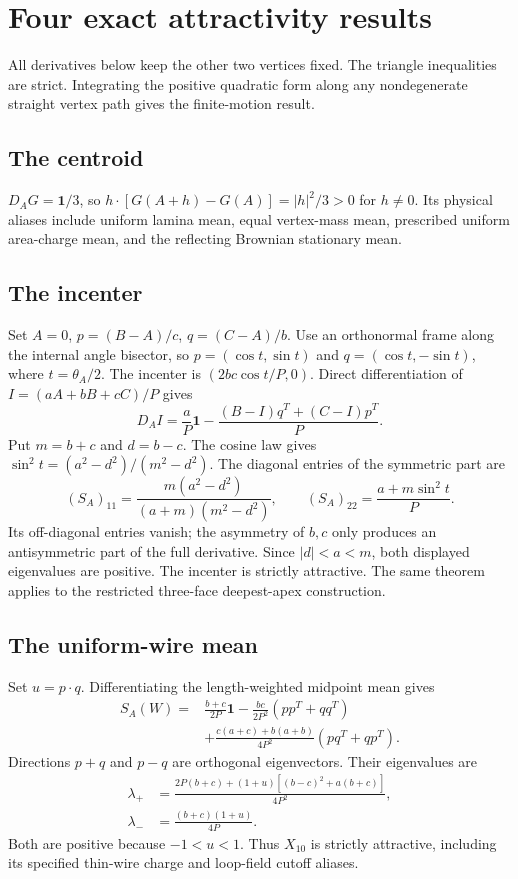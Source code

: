 \documentclass[11pt,oneside,openany]{book}
\begin{document}
\section{Four exact attractivity results}
All derivatives below keep the other two vertices fixed.
The triangle inequalities are strict. Integrating the positive
quadratic form along any nondegenerate straight vertex path gives
the finite-motion result.

\subsection{The centroid}
$D_AG=\mathbf1/3$, so
$h\cdot[G(A+h)-G(A)]=|h|^2/3>0$ for $h\ne0$.
Its physical aliases include uniform lamina mean, equal vertex-mass
mean, prescribed uniform area-charge mean, and the reflecting
Brownian stationary mean.

\subsection{The incenter}
Set $A=0$, $p=(B-A)/c$, $q=(C-A)/b$.
Use an orthonormal frame along the internal angle bisector, so
$p=(\cos t,\sin t)$ and $q=(\cos t,-\sin t)$,
where $t=\theta_A/2$.
The incenter is $(2bc\cos t/P,0)$.
Direct differentiation of $I=(aA+bB+cC)/P$ gives
\[
D_AI=\frac aP\mathbf1-
\frac{(B-I)q^T+(C-I)p^T}{P}.
\]
Put $m=b+c$ and $d=b-c$. The cosine law gives
$\sin^2t=(a^2-d^2)/(m^2-d^2)$.
The diagonal entries of the symmetric part are
\[
(S_A)_{11}=\frac{m(a^2-d^2)}{(a+m)(m^2-d^2)},\qquad
(S_A)_{22}=\frac{a+m\sin^2t}{P}.
\]
Its off-diagonal entries vanish; the asymmetry of $b,c$ only produces
an antisymmetric part of the full derivative.
Since $|d|<a<m$, both displayed eigenvalues are positive.
The incenter is strictly attractive. The same theorem applies to
the restricted three-face deepest-apex construction.

\subsection{The uniform-wire mean}
Set $u=p\cdot q$. Differentiating the length-weighted midpoint mean
gives
\[
\begin{split}
S_A(W)={}&\frac{b+c}{2P}\mathbf1
-\frac{bc}{2P^2}(pp^T+qq^T)\\
&+\frac{c(a+c)+b(a+b)}{4P^2}(pq^T+qp^T).
\end{split}
\]
Directions $p+q$ and $p-q$ are orthogonal eigenvectors. Their
eigenvalues are
\[
\begin{split}
\lambda_+&=
\frac{2P(b+c)+(1+u)[(b-c)^2+a(b+c)]}{4P^2},\\
\lambda_-&=\frac{(b+c)(1+u)}{4P}.
\end{split}
\]
Both are positive because $-1<u<1$.
Thus $X_{10}$ is strictly attractive, including its specified
thin-wire charge and loop-field cutoff aliases.
\end{document}
